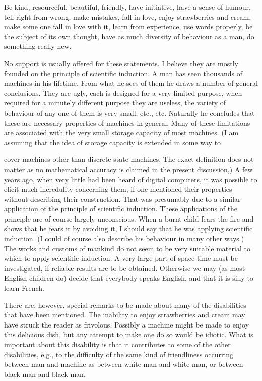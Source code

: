 \documentclass{article}
\begin{document}
Be kind, resourceful, beautiful, friendly, have initiative, have a sense of humour, tell right from wrong, make mistakes, fall in love, enjoy strawberries and cream, make some one fall in love with it, learn from experience, use words properly, be the subject of its own thought, have as much diversity of behaviour as a man, do something really new.

No support is usually offered for these statements. I believe they are mostly founded on the principle of scientific induction. A man has seen thousands of machines in his lifetime. From what he sees of them he draws a number of general conclusions. They are ugly, each is designed for a very limited purpose, when required for a minutely different purpose they are useless, the variety of behaviour of any one of them is very small, etc., etc. Naturally he concludes that these are necessary properties of machines in general. Many of these limitations are associated with the very small storage capacity of most machines. (I am assuming that the idea of storage capacity is extended in some way to

cover machines other than discrete-state machines. The exact definition does not matter as no mathematical accuracy is claimed in the present discussion,) A few years ago, when very little had been heard of digital computers, it was possible to elicit much incredulity concerning them, if one mentioned their properties without describing their construction. That was presumably due to a similar application of the principle of scientific induction. These applications of the principle are of course largely unconscious. When a burnt child fears the fire and shows that he fears it by avoiding it, I should say that he was applying scientific induction. (I could of course also describe his behaviour in many other ways.) The works and customs of mankind do not seem to be very suitable material to which to apply scientific induction. A very large part of space-time must be investigated, if reliable results are to be obtained. Otherwise we may (as most English children do) decide that everybody speaks English, and that it is silly to learn French.

There are, however, special remarks to be made about many of the disabilities that have been mentioned. The inability to enjoy strawberries and cream may have struck the reader as frivolous. Possibly a machine might be made to enjoy this delicious dish, but any attempt to make one do so would be idiotic. What is important about this disability is that it contributes to some of the other disabilities, e.g., to the difficulty of the same kind of friendliness occurring between man and machine as between white man and white man, or between black man and black man.
\end{document}
